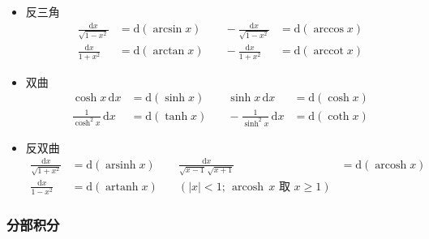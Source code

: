 \documentclass[lang=cn,newtx,10pt,scheme=chinese]{elegantbook}
\DeclareMathOperator{\arsinh}{arsinh}
\DeclareMathOperator{\arccot}{arccot}
\DeclareMathOperator{\arcosh}{arcosh}
\DeclareMathOperator{\artanh}{artanh}
\begin{document}
\begin{itemize}
  \item 反三角
  \begin{equation}
    \begin{aligned}
      \frac{\mathrm{d}x}{\sqrt{1-x^{2}}} &= \mathrm{d}(\arcsin x) &\quad -\frac{\mathrm{d}x}{\sqrt{1-x^{2}}} &= \mathrm{d}(\arccos x) \\
      \frac{\mathrm{d}x}{1+x^{2}} &= \mathrm{d}(\arctan x) &\quad -\frac{\mathrm{d}x}{1+x^{2}} &= \mathrm{d}(\arccot x)
    \end{aligned}
  \end{equation}

  \item 双曲
  \begin{equation}
    \begin{aligned}
      \cosh x\,\mathrm{d}x &= \mathrm{d}(\sinh x) &\quad \sinh x\,\mathrm{d}x &= \mathrm{d}(\cosh x) \\
      \frac{1}{\cosh^{2} x}\,\mathrm{d}x &= \mathrm{d}(\tanh x) &\quad -\frac{1}{\sinh^{2} x}\,\mathrm{d}x &= \mathrm{d}(\coth x)
    \end{aligned}
  \end{equation}

  \item 反双曲
  \begin{equation}
    \begin{aligned}
      \frac{\mathrm{d}x}{\sqrt{1+x^{2}}} &= \mathrm{d}(\arsinh x) &\quad \frac{\mathrm{d}x}{\sqrt{x-1}\,\sqrt{x+1}} &= \mathrm{d}(\arcosh x) \\
      \frac{\mathrm{d}x}{1-x^{2}} &= \mathrm{d}(\artanh x) &\quad (|x|<1;\,\arcosh\,x\text{ 取 }x\ge1)&
    \end{aligned}
  \end{equation}
\end{itemize}
    \subsubsection{分部积分}
\end{document}
